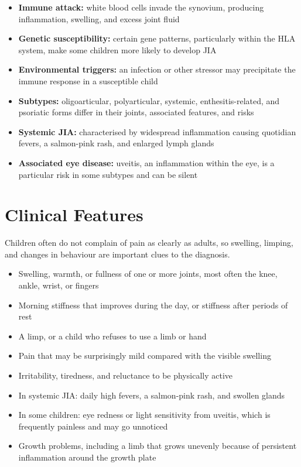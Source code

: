 \begin{itemize}
    \item \textbf{Immune attack:} white blood cells invade the synovium, producing inflammation, swelling, and excess joint fluid
    \item \textbf{Genetic susceptibility:} certain gene patterns, particularly within the HLA system, make some children more likely to develop JIA
    \item \textbf{Environmental triggers:} an infection or other stressor may precipitate the immune response in a susceptible child
    \item \textbf{Subtypes:} oligoarticular, polyarticular, systemic, enthesitis-related, and psoriatic forms differ in their joints, associated features, and risks
    \item \textbf{Systemic JIA:} characterised by widespread inflammation causing quotidian fevers, a salmon-pink rash, and enlarged lymph glands
    \item \textbf{Associated eye disease:} uveitis, an inflammation within the eye, is a particular risk in some subtypes and can be silent
\end{itemize}

\section*{Clinical Features}
Children often do not complain of pain as clearly as adults, so swelling, limping, and changes in behaviour are important clues to the diagnosis.

\begin{itemize}
    \item Swelling, warmth, or fullness of one or more joints, most often the knee, ankle, wrist, or fingers
    \item Morning stiffness that improves during the day, or stiffness after periods of rest
    \item A limp, or a child who refuses to use a limb or hand
    \item Pain that may be surprisingly mild compared with the visible swelling
    \item Irritability, tiredness, and reluctance to be physically active
    \item In systemic JIA: daily high fevers, a salmon-pink rash, and swollen glands
    \item In some children: eye redness or light sensitivity from uveitis, which is frequently painless and may go unnoticed
    \item Growth problems, including a limb that grows unevenly because of persistent inflammation around the growth plate
\end{itemize}

